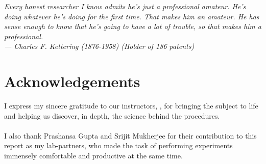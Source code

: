 
\begin{flushright}{\slshape    
Every honest researcher I know admits he's just a professional amateur.
He's doing whatever he's doing for the first time. That makes him an amateur.
He has sense enough to know that he's going to have a lot of trouble,
so that makes him a professional.\\ \medskip
--- Charles F. Kettering (1876-1958) (Holder of 186 patents)}
\end{flushright}



\bigskip

\begingroup
\let\clearpage\relax
\let\cleardoublepage\relax
\let\cleardoublepage\relax
\chapter*{Acknowledgements}
I express my sincere gratitude to our instructors, \myProf, for bringing the subject to life and helping us discover, in depth, the science behind the procedures.\\
 \\
I also thank Prashansa Gupta and Srijit Mukherjee for their contribution to this report as my lab-partners, who made the task of performing experiments immensely comfortable and productive at the same time.\\
\bigskip


\endgroup



